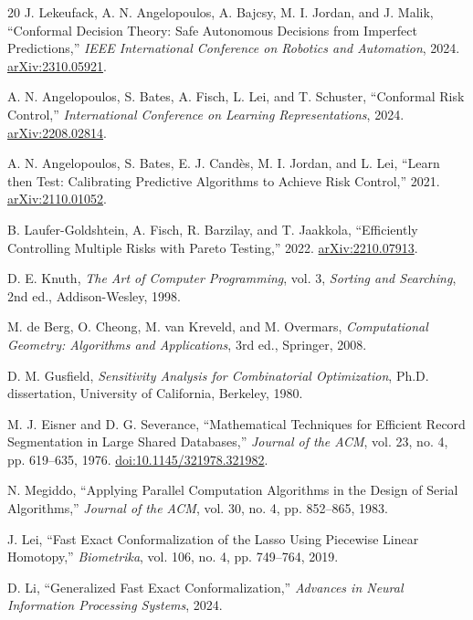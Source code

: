 \documentclass[a4paper,10pt]{article}
\theoremstyle{plain}
\theoremstyle{remark}
\begin{document}
\begin{thebibliography}{20}
 J. Lekeufack, A. N. Angelopoulos, A. Bajcsy, M. I. Jordan,
and J. Malik, ``Conformal Decision Theory: Safe Autonomous Decisions from
Imperfect Predictions,'' \emph{IEEE International Conference on Robotics
and Automation}, 2024. \href{https://arxiv.org/abs/2310.05921}{arXiv:2310.05921}.

 A. N. Angelopoulos, S. Bates, A. Fisch, L. Lei, and
T. Schuster, ``Conformal Risk Control,'' \emph{International Conference
on Learning Representations}, 2024.
\href{https://arxiv.org/abs/2208.02814}{arXiv:2208.02814}.

 A. N. Angelopoulos, S. Bates, E. J. Cand\`es, M. I. Jordan,
and L. Lei, ``Learn then Test: Calibrating Predictive Algorithms to Achieve
Risk Control,'' 2021. \href{https://arxiv.org/abs/2110.01052}{arXiv:2110.01052}.

 B. Laufer-Goldshtein, A. Fisch, R. Barzilay, and
T. Jaakkola, ``Efficiently Controlling Multiple Risks with Pareto Testing,''
2022. \href{https://arxiv.org/abs/2210.07913}{arXiv:2210.07913}.

 D. E. Knuth, \emph{The Art of Computer Programming},
vol. 3, \emph{Sorting and Searching}, 2nd ed., Addison-Wesley, 1998.

 M. de Berg, O. Cheong, M. van Kreveld, and M. Overmars,
\emph{Computational Geometry: Algorithms and Applications}, 3rd ed.,
Springer, 2008.

 D. M. Gusfield, \emph{Sensitivity Analysis for
Combinatorial Optimization}, Ph.D. dissertation, University of California,
Berkeley, 1980.

 M. J. Eisner and D. G. Severance, ``Mathematical Techniques
for Efficient Record Segmentation in Large Shared Databases,''
\emph{Journal of the ACM}, vol. 23, no. 4, pp. 619--635, 1976.
\href{https://doi.org/10.1145/321978.321982}{doi:10.1145/321978.321982}.

 N. Megiddo, ``Applying Parallel Computation Algorithms
in the Design of Serial Algorithms,'' \emph{Journal of the ACM},
vol. 30, no. 4, pp. 852--865, 1983.

 J. Lei, ``Fast Exact Conformalization of the Lasso Using
Piecewise Linear Homotopy,'' \emph{Biometrika}, vol. 106, no. 4,
pp. 749--764, 2019.

 D. Li, ``Generalized Fast Exact Conformalization,''
\emph{Advances in Neural Information Processing Systems}, 2024.


\end{thebibliography}
\end{document}
